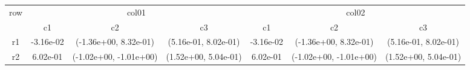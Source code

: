\begin{tabular}{ccccccc}
\toprule
\multirow{2}{*}{row}&\multicolumn{3}{c}{col01}&\multicolumn{3}{c}{col02}\tabularnewline
\cmidrule(lr){2-4}
\cmidrule(lr){5-7}
&c1&c2&c3&c1&c2&c3\tabularnewline
\midrule
r1&-3.16e-02& (-1.36e+00, 8.32e-01)& (5.16e-01, 8.02e-01)&-3.16e-02& (-1.36e+00, 8.32e-01)& (5.16e-01, 8.02e-01)\tabularnewline
r2&6.02e-01& (-1.02e+00, -1.01e+00)& (1.52e+00, 5.04e-01)&6.02e-01& (-1.02e+00, -1.01e+00)& (1.52e+00, 5.04e-01)\tabularnewline
\bottomrule
\end{tabular}
